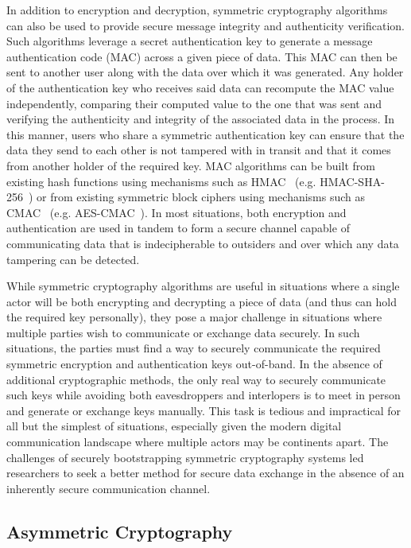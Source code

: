 In addition to encryption and decryption, symmetric cryptography
algorithms can also be used to provide secure message integrity and
authenticity verification. Such algorithms leverage a secret
authentication key to generate a message authentication code (MAC)
across a given piece of data. This MAC can then be sent to another
user along with the data over which it was generated. Any holder of
the authentication key who receives said data can recompute the MAC
value independently, comparing their computed value to the one that
was sent and verifying the authenticity and integrity of the
associated data in the process. In this manner, users who share a
symmetric authentication key can ensure that the data they send to
each other is not tampered with in transit and that it comes from
another holder of the required key. MAC algorithms can be built from
existing hash functions using mechanisms such as
HMAC~\cite{krawczyk1997} (e.g. HMAC-SHA-256~\cite{kelly2007}) or from
existing symmetric block ciphers using mechanisms such as
CMAC~\cite{black2005, dworkin2005} (e.g. AES-CMAC~\cite{song2006}). In
most situations, both encryption and authentication are used in tandem
to form a secure channel capable of communicating data that is
indecipherable to outsiders and over which any data tampering can be
detected.

While symmetric cryptography algorithms are useful in situations where
a single actor will be both encrypting and decrypting a piece of data
(and thus can hold the required key personally), they pose a major
challenge in situations where multiple parties wish to communicate or
exchange data securely. In such situations, the parties must find a
way to securely communicate the required symmetric encryption and
authentication keys out-of-band. In the absence of additional
cryptographic methods, the only real way to securely communicate such
keys while avoiding both eavesdroppers and interlopers is to meet in
person and generate or exchange keys manually. This task is tedious
and impractical for all but the simplest of situations, especially
given the modern digital communication landscape where multiple actors
may be continents apart. The challenges of securely bootstrapping
symmetric cryptography systems led researchers to seek a better method
for secure data exchange in the absence of an inherently secure
communication channel.

\subsection{Asymmetric Cryptography}

